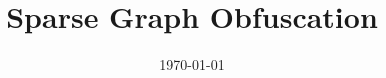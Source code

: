\documentclass[11pt]{article}
\newcommand{\myname}{Lev Stambler}
\begin{document}
\title{Sparse Graph Obfuscation}
\maketitle

% 
% 
% 
% 
% 



\date{\today}

\begin{abstract}
\end{abstract}



\end{document}
